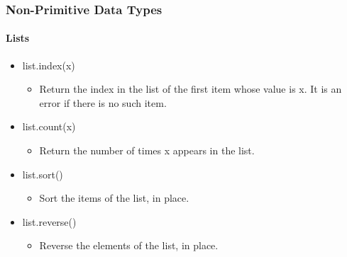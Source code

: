 \documentclass{beamer}
\begin{document}
\begin{frame}[fragile]
\frametitle{Non-Primitive Data Types}
\framesubtitle{Lists}
\begin{itemize}
	\item list.index(x)
		\begin{itemize}
		\item Return the index in the list of the first item whose value is x. It is an error if there is no such item.
		\end{itemize}

	\item list.count(x)
		\begin{itemize}
		\item Return the number of times x appears in the list.
		\end{itemize}

	\item list.sort()
		\begin{itemize}
		\item Sort the items of the list, in place.
		\end{itemize}
	
	\item list.reverse()
		\begin{itemize}
		\item Reverse the elements of the list, in place.
		\end{itemize}
\end{itemize}


\end{frame}
\end{document}
